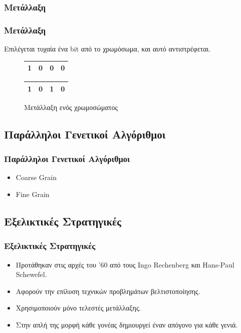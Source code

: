 \documentclass[xetex,mathserif,serif,14pt]{beamer}
\begin{document}
\subsubsection{Μετάλλαξη}

\begin{frame}
\frametitle{Μετάλλαξη}
Επιλέγεται τυχαία ένα bit από το χρωμόσωμα, και αυτό αντιστρέφεται.

\begin{figure}
    \begin{tabular}{|c|c|c|c|}
        \hline
        1 & 0 & 0 & 0\\
        \hline
    \end{tabular}
    \begin{tabular}{|c|c|c|c|}
        \hline
        1 & 0 & 1 & 0\\
        \hline
    \end{tabular}
    \caption{Μετάλλαξη ενός χρωμοσώματος}
    \label{fig_mutation}
\end{figure}
\end{frame}

\subsection{Παράλληλοι Γενετικοί Αλγόριθμοι}

\begin{frame}
\frametitle{Παράλληλοι Γενετικοί Αλγόριθμοι}
\begin{itemize}
  \item Coarse Grain
  \item Fine Grain
\end{itemize}
\end{frame}

\subsection{Εξελικτικές Στρατηγικές}

\begin{frame}
\frametitle{Εξελικτικές Στρατηγικές}
\begin{itemize}
  \item Προτάθηκαν στις αρχές του '60 από τους Ingo Rechenberg και Hans-Paul Schewefel.
  \item Αφορούν την επίλυση τεχνικών προβλημάτων βελτιστοποίησης.
  \item Χρησιμοποιούν μόνο τελεστές μετάλλαξης.
  \item Στην απλή της μορφή κάθε γονέας δημιουργεί έναν απόγονο για κάθε γενιά.
\end{itemize}
\end{frame}
\end{document}

